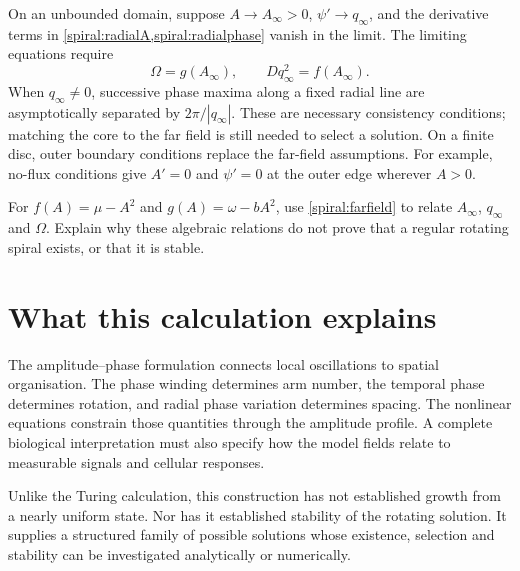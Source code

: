 \documentclass[main.tex]{subfiles}
\begin{document}
On an unbounded domain, suppose $A\to A_\infty>0$, $\psi'\to q_\infty$, and the derivative terms in \cref{spiral:radialA,spiral:radialphase} vanish in the limit. The limiting equations require
\begin{equation}\label{spiral:farfield}
\Omega=g(A_\infty),\qquad Dq_\infty^2=f(A_\infty).
\end{equation}
When $q_\infty\ne0$, successive phase maxima along a fixed radial line are asymptotically separated by $2\pi/|q_\infty|$. These are necessary consistency conditions; matching the core to the far field is still needed to select a solution. On a finite disc, outer boundary conditions replace the far-field assumptions. For example, no-flux conditions give $A'=0$ and $\psi'=0$ at the outer edge wherever $A>0$.

\begin{do-it-yourself}
For $f(A)=\mu-A^2$ and $g(A)=\omega-bA^2$, use \cref{spiral:farfield} to relate $A_\infty$, $q_\infty$ and $\Omega$. Explain why these algebraic relations do not prove that a regular rotating spiral exists, or that it is stable.
\end{do-it-yourself}

\section{What this calculation explains}
The amplitude--phase formulation connects local oscillations to spatial organisation. The phase winding determines arm number, the temporal phase determines rotation, and radial phase variation determines spacing. The nonlinear equations constrain those quantities through the amplitude profile. A complete biological interpretation must also specify how the model fields relate to measurable signals and cellular responses.

Unlike the Turing calculation, this construction has not established growth from a nearly uniform state. Nor has it established stability of the rotating solution. It supplies a structured family of possible solutions whose existence, selection and stability can be investigated analytically or numerically.
\end{document}
